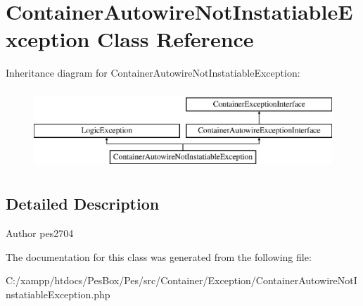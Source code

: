 \hypertarget{class_pes_1_1_container_1_1_exception_1_1_container_autowire_not_instatiable_exception}{}\section{Container\+Autowire\+Not\+Instatiable\+Exception Class Reference}
\label{class_pes_1_1_container_1_1_exception_1_1_container_autowire_not_instatiable_exception}
Inheritance diagram for Container\+Autowire\+Not\+Instatiable\+Exception\+:\begin{figure}[H]
\begin{center}
\leavevmode
\includegraphics[height=3.000000cm]{class_pes_1_1_container_1_1_exception_1_1_container_autowire_not_instatiable_exception}
\end{center}
\end{figure}


\subsection{Detailed Description}
\begin{DoxyAuthor}{Author}
pes2704 
\end{DoxyAuthor}


The documentation for this class was generated from the following file\+:\begin{DoxyCompactItemize}
\item 
C\+:/xampp/htdocs/\+Pes\+Box/\+Pes/src/\+Container/\+Exception/Container\+Autowire\+Not\+Instatiable\+Exception.\+php\end{DoxyCompactItemize}
